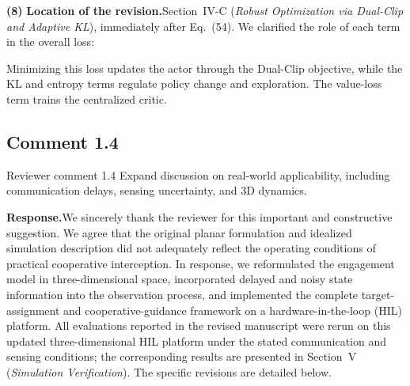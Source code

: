\documentclass[11pt]{article}
\newcommand{\hladd}[1]{{\color{addblue}#1}}
\newcommand{\rsp}{\medskip\noindent\textbf{Response.}\quad}
\newcommand{\loc}{\medskip\noindent\textbf{Location of the revision.}\quad}
\begin{document}
\medskip
\noindent\textbf{(8)}
\loc Section~IV-C (\emph{Robust Optimization via Dual-Clip and Adaptive
KL}), immediately after Eq.~(54). We clarified the role of each term in the
overall loss:

\begin{tcolorbox}[enhanced,breakable,colback=white,colframe=addblue!55,
coltext=addblue,fontupper=\color{addblue},boxrule=0.6pt,arc=2pt,
left=9pt,right=9pt,top=7pt,bottom=7pt]
\hladd{Minimizing this loss updates the actor through the Dual-Clip
objective, while the KL and entropy terms regulate policy change and
exploration. The value-loss term trains the centralized critic.}
\end{tcolorbox}




\subsection*{Comment 1.4}

\begin{reviewercomment}{Reviewer comment 1.4}
Expand discussion on real-world applicability, including communication delays,
sensing uncertainty, and 3D dynamics.
\end{reviewercomment}

\rsp We sincerely thank the reviewer for this important and constructive
suggestion. We agree that the original planar formulation and idealized
simulation description did not adequately reflect the operating conditions
of practical cooperative interception. In response, we reformulated the
engagement model in three-dimensional space, incorporated delayed and noisy
state information into the observation process, and implemented the complete
target-assignment and cooperative-guidance framework on a hardware-in-the-loop
(HIL) platform. All evaluations reported in the revised manuscript were rerun
on this updated three-dimensional HIL platform under the stated
communication and sensing conditions; the corresponding results are presented
in Section~V (\emph{Simulation Verification}). The specific revisions are
detailed below.
\end{document}
